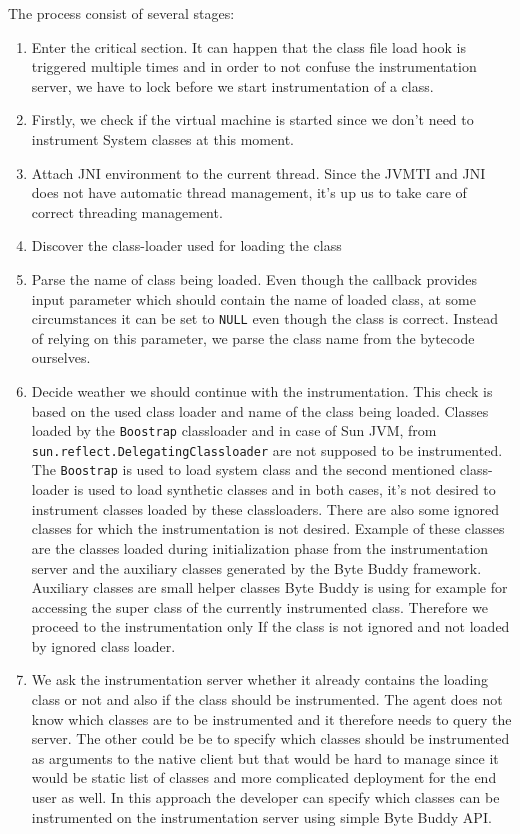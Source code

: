 The process consist of several stages:
\begin{enumerate}
	
	\item Enter the critical section. It can happen that the class file load hook is triggered multiple times and in order to not confuse the instrumentation server, we have to lock before we start instrumentation of a class.
	\item Firstly, we check if the virtual machine is started since we don't need to instrument System classes at this moment.
	\item Attach JNI environment to the current thread. Since the JVMTI and JNI does not have automatic thread management, it's up us to take care of correct threading management.
	\item Discover the class-loader used for loading the class
	\item Parse the name of class being loaded. Even though the callback provides input parameter which should contain the name of loaded class, at some circumstances it can be set to \texttt{NULL} even though the class is correct. Instead of relying on this parameter, we parse the class name from the bytecode ourselves.
	\item Decide weather we should continue with the instrumentation. This check is based on the used class loader and name of the class being loaded. Classes loaded by the \texttt{Boostrap} classloader and in case of Sun JVM, from \texttt{sun.reflect.DelegatingClassloader} are not supposed to be instrumented. 
	The \texttt{Boostrap} is used to load system class and the second mentioned class-loader is used to load synthetic classes and in both cases, it's not desired to instrument classes loaded by these classloaders.
	There are also some ignored classes for which the instrumentation is not desired. Example of these classes are the classes loaded during initialization phase from the instrumentation server and the auxiliary classes generated by the Byte Buddy framework. Auxiliary classes are small helper classes Byte Buddy is using for example for accessing the super class of the currently instrumented class. Therefore we proceed to the instrumentation only If the class is not ignored and not loaded by ignored class loader.
	\item We ask the instrumentation server whether it already contains the loading class or not and also if the class should be instrumented. The agent does not know which classes are to be instrumented and it therefore needs to query the server. The other could be be to specify which classes should be instrumented as arguments to the native client but that would be hard to manage since it would be static list of classes and more complicated deployment for the end user as well. In this approach the developer can specify which classes can be instrumented on the instrumentation server using simple Byte Buddy API. 
	

\end{enumerate}
